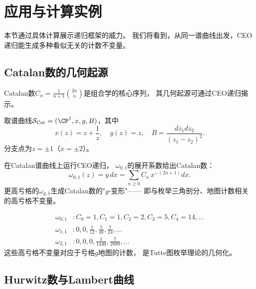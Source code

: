 
\section{应用与计算实例}\label{sec:apps}

本节通过具体计算展示递归框架的威力。
我们将看到，从同一谱曲线出发，CEO递归能生成多种看似无关的计数不变量。

\subsection{Catalan数的几何起源}

Catalan数$C_n = \frac{1}{n+1}\binom{2n}{n}$是组合学的核心序列，
其几何起源可通过CEO递归揭示。

\begin{definition}[Catalan谱曲线]\label{def:catalan}
取谱曲线$\mathcal{S}_{\mathrm{Cat}} = (\CP^1, x, y, B)$，其中
\[
x(z) = z + \frac{1}{z}, \quad y(z) = z, \quad B = \frac{dz_1 dz_2}{(z_1 - z_2)^2}.
\]
分支点为$z = \pm 1$（$x = \pm 2$）。
\end{definition}

\begin{theorem}[Catalan数的递归生成]\label{thm:catalan}
在Catalan谱曲线上运行CEO递归，
$\omega_{0,1}$的展开系数给出Catalan数：
\[
\omega_{0,1}(z) = y \, dx = \sum_{n \geq 0} C_n \, x^{-(2n+1)} dx.
\]
更高亏格的$\omega_{g,1}$生成Catalan数的"$g$-变形"——
即与枚举三角剖分、地图计数相关的高亏格不变量。
\end{theorem}

\begin{example}[前几个高亏格Catalan不变量]\label{ex:catalan}
\begin{align*}
\omega_{0,1} &: C_0 = 1, C_1 = 1, C_2 = 2, C_3 = 5, C_4 = 14, \ldots \\
\omega_{1,1} &: 0, 0, \frac{1}{12}, \frac{5}{48}, \frac{7}{24}, \ldots \\
\omega_{2,1} &: 0, 0, 0, \frac{1}{1440}, \frac{7}{2880}, \ldots
\end{align*}
这些高亏格不变量对应于亏格$g$地图的计数，
是Tutte图枚举理论的几何化。
\end{example}

\subsection{Hurwitz数与Lambert曲线}

